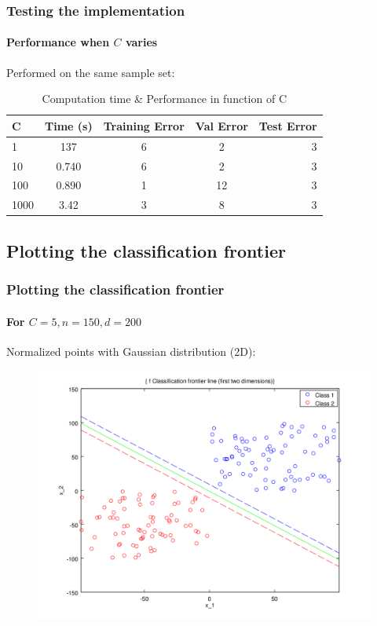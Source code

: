 \documentclass{beamer}
\begin{document}
\begin{frame}
\frametitle{Testing the implementation}
\framesubtitle{Performance when $C$ varies}

Performed on the same sample set:\\

                \begin{table}
                \centering
                \caption{Computation time \& Performance in function of C}
                \begin{tabular}{| l | c | c | c | r |}
                \hline
               C  & Time (s) & Training Error & Val Error & Test Error\\ \hline
              
               1  & 137 & 6 & 2 & 3\\ \hline
               10  & 0.740 & 6 & 2 & 3  \\ \hline
               100 & 0.890 & 1 & 12 & 3\\ \hline
               1000 & 3.42 & 3 & 8 & 3\\ \hline
                \end{tabular}
                \end{table}

\end{frame}

\subsection{Plotting the classification frontier}

\begin{frame}
\tableofcontents[currentsubsection]
\end{frame}

\begin{frame}
\frametitle{Plotting the \textbf{classification frontier}}
\framesubtitle{For $C = 5, n = 150, d = 200$}

Normalized points with Gaussian distribution (2D):

         \begin{figure}
         \centering
         \includegraphics[scale=0.4]{images/line4.png}
         \end{figure}

\end{frame}
\end{document}
